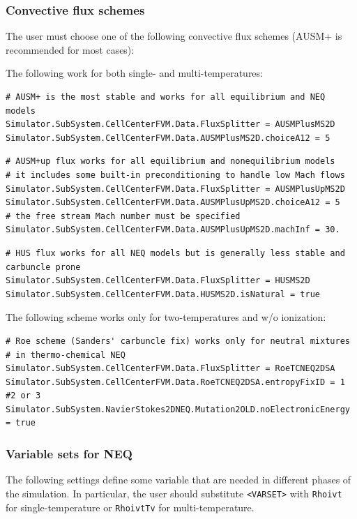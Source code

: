 \documentclass[11pt]{article}
\begin{document}
\subsubsection{Convective flux schemes}

The user must choose one of the following convective flux schemes (AUSM+ is recommended for most cases):

The following work for both single- and multi-temperatures:
\begin{lstlisting}[breaklines]
# AUSM+ is the most stable and works for all equilibrium and NEQ models
Simulator.SubSystem.CellCenterFVM.Data.FluxSplitter = AUSMPlusMS2D
Simulator.SubSystem.CellCenterFVM.Data.AUSMPlusMS2D.choiceA12 = 5
\end{lstlisting}

\begin{lstlisting}[breaklines]
# AUSM+up flux works for all equilibrium and nonequilibrium models
# it includes some built-in preconditioning to handle low Mach flows
Simulator.SubSystem.CellCenterFVM.Data.FluxSplitter = AUSMPlusUpMS2D
Simulator.SubSystem.CellCenterFVM.Data.AUSMPlusUpMS2D.choiceA12 = 5
# the free stream Mach number must be specified
Simulator.SubSystem.CellCenterFVM.Data.AUSMPlusUpMS2D.machInf = 30.
\end{lstlisting}

\begin{lstlisting}[breaklines]
# HUS flux works for all NEQ models but is generally less stable and carbuncle prone
Simulator.SubSystem.CellCenterFVM.Data.FluxSplitter = HUSMS2D
Simulator.SubSystem.CellCenterFVM.Data.HUSMS2D.isNatural = true
\end{lstlisting}

The following scheme works only for two-temperatures and w/o ionization:
\begin{lstlisting}[breaklines]
# Roe scheme (Sanders' carbuncle fix) works only for neutral mixtures
# in thermo-chemical NEQ
Simulator.SubSystem.CellCenterFVM.Data.FluxSplitter = RoeTCNEQ2DSA 
Simulator.SubSystem.CellCenterFVM.Data.RoeTCNEQ2DSA.entropyFixID = 1  #2 or 3 
Simulator.SubSystem.NavierStokes2DNEQ.Mutation2OLD.noElectronicEnergy = true
\end{lstlisting}

\subsubsection{Variable sets for NEQ}

The following settings define some variable that are needed in different phases of the simulation.
In particular, the user should substitute {\tt <VARSET>} with {\tt Rhoivt} for single-temperature or {\tt RhoivtTv} for multi-temperature.
\end{document}
